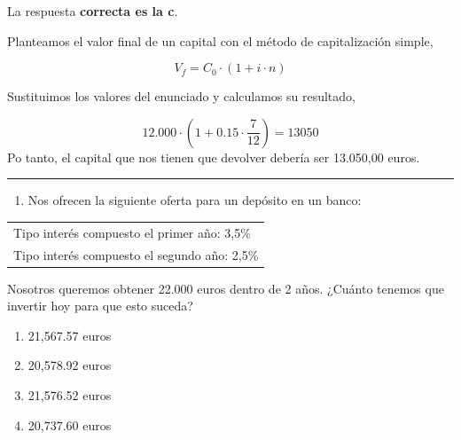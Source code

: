 \documentclass[
  letterpaper,
  DIV=11,
  numbers=noendperiod]{scrreprt}
\providecommand{\tightlist}{%
  \setlength{\itemsep}{0pt}\setlength{\parskip}{0pt}}\usepackage{longtable,booktabs,array}
\begin{document}
\begin{tcolorbox}[enhanced jigsaw, left=2mm, opacityback=0, colback=white, breakable, arc=.35mm, bottomrule=.15mm, rightrule=.15mm, toprule=.15mm, leftrule=.75mm, colframe=quarto-callout-tip-color-frame]
\begin{minipage}[t]{5.5mm}
\textcolor{quarto-callout-tip-color}{\faLightbulb}
\end{minipage}%
\begin{minipage}[t]{\textwidth - 5.5mm}

La respuesta \textbf{correcta es la c}.

Planteamos el valor final de un capital con el método de capitalización
simple,

\[V_f=C_0\cdot\left(1+i\cdot n\right)\]

Sustituimos los valores del enunciado y calculamos su resultado,

\[12.000\cdot\left(1+0.15\cdot\frac{7}{12}\right)=13050\] Po tanto, el
capital que nos tienen que devolver debería ser 13.050,00 euros.

\end{minipage}%
\end{tcolorbox}

\begin{center}\rule{0.5\linewidth}{0.5pt}\end{center}

\begin{enumerate}
\def\labelenumi{\arabic{enumi}.}
\setcounter{enumi}{8}
\tightlist
\item
  Nos ofrecen la siguiente oferta para un depósito en un banco:
\end{enumerate}

\begin{longtable}[]{@{}l@{}}
\toprule()
\endhead
Tipo interés compuesto el primer año: 3,5\% \\
Tipo interés compuesto el segundo año: 2,5\% \\
\bottomrule()
\end{longtable}

Nosotros queremos obtener 22.000 euros dentro de 2 años. ¿Cuánto tenemos
que invertir hoy para que esto suceda?

\begin{enumerate}
\def\labelenumi{\alph{enumi})}
\item
  21,567.57 euros
\item
  20,578.92 euros
\item
  21,576.52 euros
\item
  20,737.60 euros
\end{enumerate}
\end{document}
